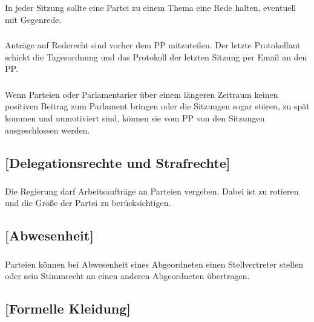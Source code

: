 \documentclass[a4paper, 11pt]{report}
\let\oldsubsection\subsection
\renewcommand{\subsection}{\leftskip=40pt\oldsubsection}
\begin{document}
\subsubsection{}
In jeder Sitzung sollte eine Partei zu einem Thema eine Rede halten, eventuell mit Gegenrede.

\subsubsection{}
Anträge auf Rederecht sind vorher dem PP mitzuteilen. Der letzte Protokollant schickt die Tagesordnung und das Protokoll der letzten Sitzung per Email an den PP.

\subsubsection{}
Wenn Parteien oder Parlamentarier über einem längeren Zeitraum keinen positiven Beitrag zum Parlament bringen oder die Sitzungen sogar stören, zu spät kommen und unmotiviert sind, können sie vom PP von den Sitzungen ausgeschlossen werden. 

 

\subsection{[Delegationsrechte und Strafrechte]}

 
\subsubsection{}
Die Regierung darf Arbeitsaufträge an Parteien vergeben. Dabei ist zu rotieren und die Größe der Partei zu berücksichtigen.
 

\subsection{[Abwesenheit]}

 

\subsubsection{}
Parteien können bei Abwesenheit eines Abgeordneten einen Stellvertreter stellen oder sein Stimmrecht an einen anderen Abgeordneten übertragen. 

 

\subsection{[Formelle Kleidung]}
\end{document}
